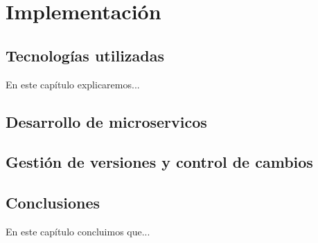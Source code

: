 \chapter{Implementación}\label{cap:implementacion}

\section{Tecnologías utilizadas}
En este capítulo explicaremos...

\section{Desarrollo de microservicos}

\section{Gestión de versiones y control de cambios}

\section{Conclusiones}
En este capítulo concluimos que...